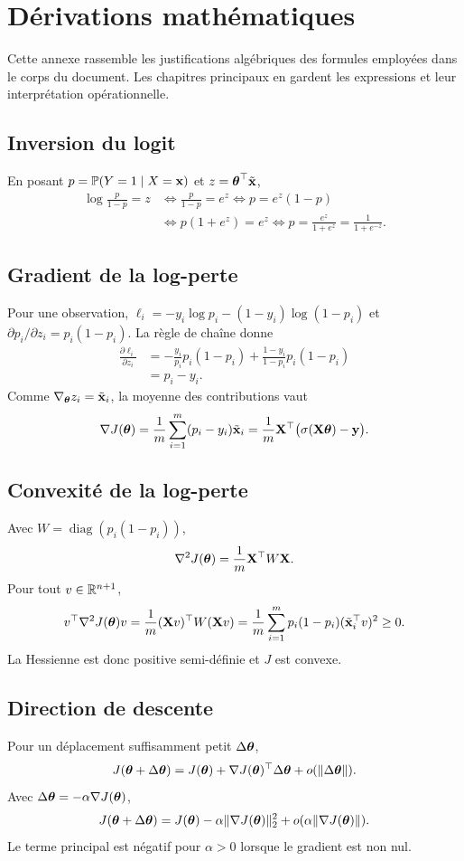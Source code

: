 \chapter{Dérivations mathématiques}
\label{app:derivations}

Cette annexe rassemble les justifications algébriques des formules employées dans
le corps du document. Les chapitres principaux en gardent les expressions et leur
interprétation opérationnelle.

\section{Inversion du logit}
\label{app:logit-inversion}

En posant $p=\mathbb{P}(Y=1\mid X=\mathbf{x})$ et $z=\boldsymbol{\theta}^\top\tilde{\mathbf{x}}$,
\begin{align*}
  \log\frac{p}{1-p}=z
  &\iff \frac{p}{1-p}=e^z
  \iff p=e^z(1-p)\\
  &\iff p(1+e^z)=e^z
  \iff p=\frac{e^z}{1+e^z}=\frac1{1+e^{-z}}.
\end{align*}

\section{Gradient de la log-perte}
\label{app:gradient-derivation}

Pour une observation,
$\ell_i=-y_i\log p_i-(1-y_i)\log(1-p_i)$ et
$\partial p_i/\partial z_i=p_i(1-p_i)$. La règle de chaîne donne
\begin{align*}
  \frac{\partial\ell_i}{\partial z_i}
  &=-\frac{y_i}{p_i}p_i(1-p_i)
    +\frac{1-y_i}{1-p_i}p_i(1-p_i)\\
  &=p_i-y_i.
\end{align*}
Comme $\nabla_{\boldsymbol{\theta}}z_i=\tilde{\mathbf{x}}_i$, la moyenne des contributions vaut
\[
  \nabla J(\boldsymbol{\theta})=\frac1m\sum_{i=1}^m(p_i-y_i)\tilde{\mathbf{x}}_i
  =\frac1m\mathbf{X}^\top\bigl(\sigma(\mathbf{X}\boldsymbol{\theta})-\mathbf{y}\bigr).
\]

\section{Convexité de la log-perte}
\label{app:convexity-proof}

Avec $W=\operatorname{diag}(p_i(1-p_i))$,
\[
  \nabla^2J(\boldsymbol{\theta})=\frac1m\mathbf{X}^\top W\mathbf{X}.
\]
Pour tout $v\in\mathbb{R}^{n+1}$,
\[
  v^\top\nabla^2J(\boldsymbol{\theta})v
  =\frac1m(\mathbf{X} v)^\top W(\mathbf{X} v)
  =\frac1m\sum_{i=1}^m p_i(1-p_i)(\tilde{\mathbf{x}}_i^\top v)^2\geq0.
\]
La Hessienne est donc positive semi-définie et $J$ est convexe.

\section{Direction de descente}
\label{app:descent-direction}

Pour un déplacement suffisamment petit $\Delta\boldsymbol{\theta}$,
\[
  J(\boldsymbol{\theta}+\Delta\boldsymbol{\theta})
  =J(\boldsymbol{\theta})+\nabla J(\boldsymbol{\theta})^\top\Delta\boldsymbol{\theta}
  +o(\|\Delta\boldsymbol{\theta}\|).
\]
Avec $\Delta\boldsymbol{\theta}=-\alpha\nabla J(\boldsymbol{\theta})$,
\[
  J(\boldsymbol{\theta}+\Delta\boldsymbol{\theta})
  =J(\boldsymbol{\theta})-\alpha\|\nabla J(\boldsymbol{\theta})\|_2^2
  +o(\alpha\|\nabla J(\boldsymbol{\theta})\|).
\]
Le terme principal est négatif pour $\alpha>0$ lorsque le gradient est non nul.
